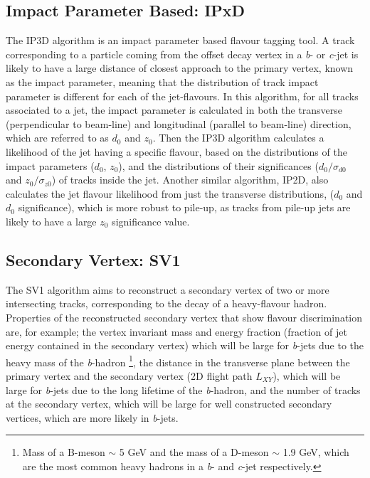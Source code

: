 \documentclass[12pt, onecolumn,notitlepage]{article}
\begin{document}
\subsection{Impact Parameter Based: IPxD}  \label{ss_Algos_IPxD}

The IP3D algorithm is an impact parameter based flavour tagging tool. 
A track corresponding to a particle coming from the offset decay vertex in a \textit{b}- or \textit{c}-jet is likely to have a large distance of 
closest approach to the primary vertex, known as the impact parameter, meaning that the distribution of track impact parameter is different for each of the jet-flavours.
In this algorithm, for all tracks associated to a jet, the impact parameter is calculated in both the transverse (perpendicular to beam-line)
and longitudinal (parallel to beam-line) direction, which are referred to as $d_{0}$ and $z_{0}$.
Then the IP3D algorithm calculates a likelihood of the jet having a specific flavour, 
based on the distributions of the impact parameters ($d_{0}$, $z_{0}$), and the distributions of their significances 
($d_{0}/\sigma _{d0}$ and  $z_{0}/\sigma_{z0}$) of tracks inside the jet. 
Another similar algorithm, IP2D, also calculates the jet flavour likelihood from just the transverse distributions, ($d_{0}$ and $d_{0}$ significance), which is more
robust to pile-up, as tracks from pile-up jets are likely to have a large $z_{0}$ significance value.

\subsection{Secondary Vertex: SV1}  \label{ss_Algos_SV1}

The SV1 algorithm aims to reconstruct a secondary vertex of two or more intersecting tracks, corresponding to the decay of a heavy-flavour hadron. 
Properties of the reconstructed secondary vertex that show flavour discrimination are, for example; the vertex 
invariant mass and energy fraction (fraction of jet energy contained in the secondary vertex) which will be large for 
\textit{b}-jets due to the heavy mass of the \textit{b}-hadron 
\footnote{Mass of a B-meson $\sim$ 5 GeV and the mass of a D-meson $\sim$ 1.9 GeV, which are the most common heavy hadrons in a \textit{b}- and \textit{c}-jet respectively.}, 
the distance in the transverse plane between the 
primary vertex and the secondary vertex (2D flight path $L_{XY}$), which will be large for \textit{b}-jets due to the long lifetime of the \textit{b}-hadron,
and the number of tracks at the secondary vertex, which will be large for well constructed secondary vertices, which are more likely in \textit{b}-jets.
\end{document}
